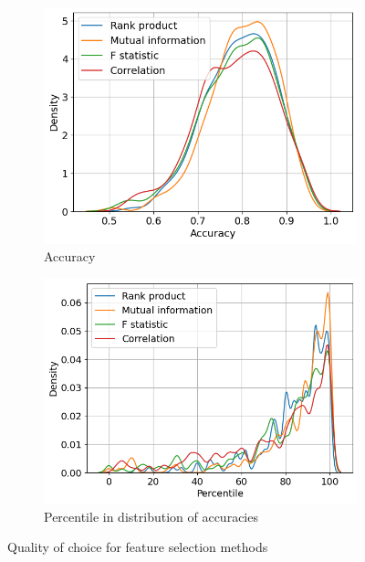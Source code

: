 \begin{figure}[t]
    \centering
    \begin{subfigure}[b]{0.48\textwidth}
        \includegraphics[width=\textwidth]{assets/results/feature-combinations/fsel-accuracy.png}
        \caption{Accuracy}
    \end{subfigure}
    \hfill
    \begin{subfigure}[b]{0.48\textwidth}
        \includegraphics[width=\textwidth]{assets/results/feature-combinations/fsel-percentile.png}
        \caption{Percentile in distribution of accuracies}
    \end{subfigure}
    \caption{Quality of choice for feature selection methods}
    \label{fig:evaluation:kde-fsel-perecentile}
\end{figure}

